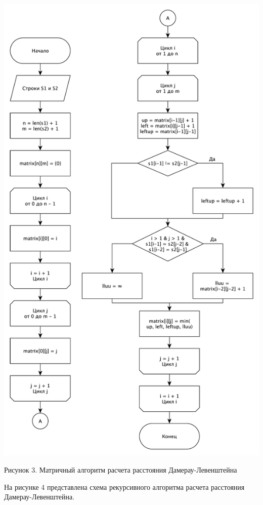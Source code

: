 \documentclass[a4paper,12pt]{article}
\begin{document}
\begin{center}
    \includegraphics[scale=0.6]{DLmatrix}

    Рисунок 3. Матричный алгоритм расчета расстояния Дамерау-Левенштейна
\end{center}

На рисунке 4 представлена схема рекурсивного алгоритма расчета расстояния Дамерау-Левенштейна.
\end{document}

